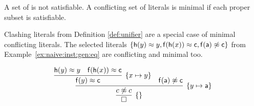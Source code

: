\begin{definition}\label{def:minimal:conflicting:literals}
	A set of  is not satisfiable.
	A conflicting set of literals is minimal if each proper subset is satisfiable.
\end{definition}

\begin{example}\label{ex:minimal:conflicting:literals}
	Clashing literals from Definition \vref{def:unifier} 
	are a special case of minimal conflicting literals.
	The selected literals \( \{ \mathsf{h}(y)\approx y, \mathsf{f}(\mathsf{h}(x))\approx \mathsf{c}, \mathsf{f}(\mathsf{a})\not\approx\mathsf{c} \} \) 
	from Example~\vref{ex:naive:inst:gen:eq} are conflicting and minimal too.

	\begin{gather*}
		\infer[\mysub{y\mapsto \ma}]{
			\infer[\{\}]{\emptyclause}{c\mNE c}
			}{
		\infer[\mysub{x\mapsto y}]
		{\mf(y)\mEQ\mc}
		{\mh(y)\mEQ y & \mf(\mh(x))\mEQ \mc}
		& \mf(\ma)\mNE\mc
		}
	\end{gather*}
\end{example}

